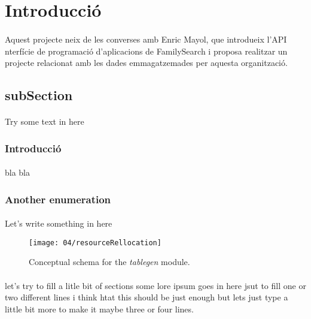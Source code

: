 \section{Introducció}
\paragraph{}
Aquest projecte neix de les converses amb Enric Mayol, que introdueix l'API nterfície de programació d'aplicacions de FamilySearch i proposa realitzar un projecte relacionat amb les dades emmagatzemades per aquesta organització.

\subsection{subSection}
\paragraph{}
Try some text in here

\subsubsection{Introducció}
\paragraph{}

\paragraph{}
bla bla

\subsubsection{Another enumeration}
\paragraph{}
Let's write something in here

\begin{figure}
        \texttt{[image: 04/resourceRellocation]}
        \centering
        \caption{Conceptual schema for the \emph{tablegen} module.}
\end{figure}

\paragraph{}
let's try to fill a litle bit of sections some lore ipsum goes in here jsut to fill one or two different lines i think htat this should be just enough but lets just type a little bit more to make it maybe three or four lines.


